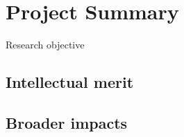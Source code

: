 \section{Project Summary}

Research objective

\subsection{Intellectual merit}

\subsection{Broader impacts}
  
  